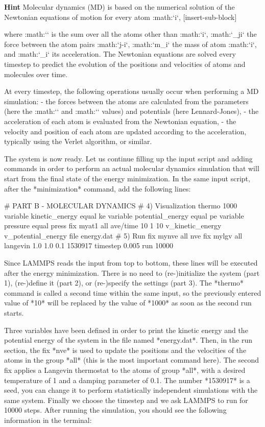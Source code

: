 \textbf{Hint} Molecular dynamics (MD) is based on the numerical solution of the Newtonian
equations of motion for every atom :math:`i`,
[insert-sub-block]

where :math:`\sum` is the sum over all the atoms other than :math:`i`, 
:math:`_{ji}` the force between the atom pairs :math:`j-i`,
:math:`m_i` the mass of atom :math:`i`, and :math:`_i` its acceleration. 
The Newtonian equations are solved every timestep to predict the
evolution of the positions and velocities of atoms and molecules over time. 

At every timestep, the following operations usually occur when 
performing a MD simulation:
- the forces between the atoms are calculated from the parameters (here the :math:`\epsilon` and :math:`\sigma` values) and potentials (here Lennard-Jones),
- the acceleration of each atom is evaluated from the Newtonian equation,
- the velocity and position of each atom are updated according to the acceleration, typically using the Verlet algorithm, or similar.


The system is now ready. Let us continue filling up the
input script and adding commands in order to perform an actual molecular dynamics
simulation that will start from the final state of the energy minimization.
In the same input script, after the *minimization* command, add the following
lines:



\begin{lcverbatim}
# PART B - MOLECULAR DYNAMICS
# 4) Visualization
thermo 1000
variable kinetic_energy equal ke
variable potential_energy equal pe
variable pressure equal press
fix myat1 all ave/time 10 1 10 v_kinetic_energy v_potential_energy file energy.dat
# 5) Run
fix mynve all nve
fix mylgv all langevin 1.0 1.0 0.1 1530917
timestep 0.005
run 10000
\end{lcverbatim}

Since LAMMPS reads the input from top to
bottom, these lines will be executed after the energy
minimization. There is no need to (re-)initialize the system
(part 1), (re-)define it (part 2), or (re-)specify the settings
(part 3). The *thermo* command is called a second time within the 
same input, so the previously entered value of *10* will be replaced
by the value of *1000* as soon as the second run starts.


Three variables have been defined in order
to print the kinetic energy and the potential energy 
of the system in the file named *energy.dat*. Then,
in the run section, the fix *nve* is used to update the
positions and the velocities of the atoms in the group
*all* (this is the most important command here). The second
fix applies a Langevin thermostat to the atoms of group
*all*, with a desired temperature of 1 and a damping
parameter of 0.1. The number *1530917* is a seed, you can
change it to perform statistically independent simulations
with the same system. Finally we choose the timestep
and we ask LAMMPS to run for 10000 steps. After running
the simulation, you should see the following information in
the terminal:



